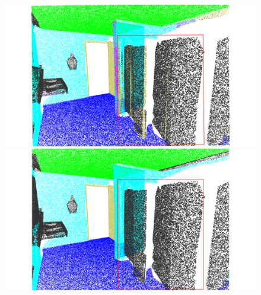 \begin{figure}[htbp]
\begin{minipage}{0.185\textwidth}
    \end{minipage}
    \hfill
    \begin{minipage}{0.185\textwidth}
        \centering
        \includegraphics[width=\textwidth]{fig/supplement/semantic_segmentation/wc_2/PLT_wc_2.pdf}
    \end{minipage}
    \hfill
    \begin{minipage}{0.185\textwidth}
        \centering
        \includegraphics[width=\textwidth]{fig/supplement/semantic_segmentation/wc_2/GT_wc_2.pdf}
    \end{minipage}
    \hfill
    

\end{figure}

